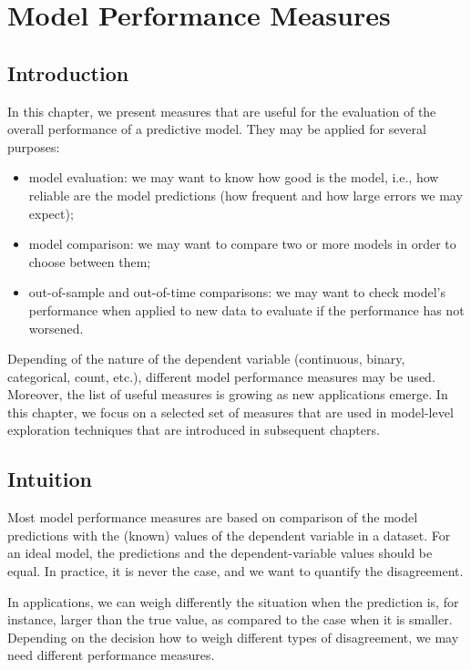 \documentclass[]{krantz}
\providecommand{\tightlist}{%
  \setlength{\itemsep}{0pt}\setlength{\parskip}{0pt}}
\begin{document}
\hypertarget{modelPerformance}{%
\chapter{Model Performance Measures}\label{modelPerformance}}

\hypertarget{modelPerformanceIntro}{%
\section{Introduction}\label{modelPerformanceIntro}}

In this chapter, we present measures that are useful for the evaluation of the overall performance of a predictive model. They may be applied for several purposes:

\begin{itemize}
\tightlist
\item
  model evaluation: we may want to know how good is the model, i.e., how reliable are the model predictions (how frequent and how large errors we may expect);
\item
  model comparison: we may want to compare two or more models in order to choose between them;
\item
  out-of-sample and out-of-time comparisons: we may want to check model's performance when applied to new data to evaluate if the performance has not worsened.
\end{itemize}

Depending of the nature of the dependent variable (continuous, binary, categorical, count, etc.), different model performance measures may be used. Moreover, the list of useful measures is growing as new applications emerge. In this chapter, we focus on a selected set of measures that are used in model-level exploration techniques that are introduced in subsequent chapters.

\hypertarget{modelPerformanceIntuition}{%
\section{Intuition}\label{modelPerformanceIntuition}}

Most model performance measures are based on comparison of the model predictions with the (known) values of the dependent variable in a dataset. For an ideal model, the predictions and the dependent-variable values should be equal. In practice, it is never the case, and we want to quantify the disagreement.

In applications, we can weigh differently the situation when the prediction is, for instance, larger than the true value, as compared to the case when it is smaller. Depending on the decision how to weigh different types of disagreement, we may need different performance measures.
\end{document}
